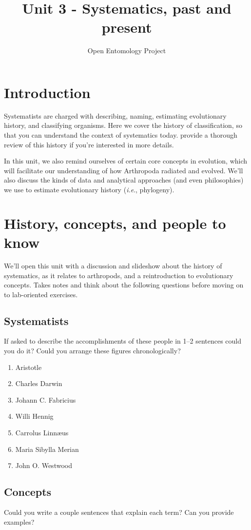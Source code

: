 \documentclass[letterpaper, 11pt]{article}
\title{Unit 3 - Systematics, past and present}
\author{Open Entomology Project}
\begin{document}
\cleanlookdateon %
\maketitle
\thispagestyle{fancy}
\section*{Introduction}
Systematists are charged with describing, naming, estimating evolutionary history, and classifying organisms. Here we cover the history of classification, so that you can understand the context of systematics today. \cite{EngelKristensen2013} provide a thorough review of this history if you're interested in more details.

In this unit, we also remind ourselves of certain core concepts in evolution, which will facilitate our understanding of how Arthropoda radiated and evolved. We'll also discuss the kinds of data and analytical approaches (and even philosophies) we use to estimate evolutionary history (\textit{i.e}., phylogeny).

\section{History, concepts, and people to know}
We'll open this unit with a discussion and slideshow about the history of systematics, as it relates to arthropods, and a reintroduction to evolutionary concepts. Takes notes and think about the following questions before moving on to lab-oriented exercises.
\subsection{Systematists}
If asked to describe the accomplishments of these people in 1--2 sentences could you do it? Could you arrange these figures chronologically?

\begin{enumerate} 
\item{Aristotle} 
\item{Charles Darwin}  
\item {Johann C. Fabricius}
\item {Willi Hennig}
\item{Carrolus Linn\ae{us}}  
\item{Maria Sibylla Merian}  
\item{John O. Westwood}  
\end{enumerate}

\subsection{Concepts}
Could you write a couple sentences that explain each term? Can you provide examples?
\end{document}
